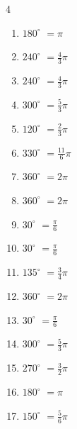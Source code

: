 \begin{multicols}{4}
\begin{enumerate}
  \item $\displaystyle 180^{\circ}$
        $\displaystyle =\pi$

  \item $\displaystyle 240^{\circ}$
        $\displaystyle =\frac{4}{3}\pi$

  \item $\displaystyle 240^{\circ}$
        $\displaystyle =\frac{4}{3}\pi$

  \item $\displaystyle 300^{\circ}$
        $\displaystyle =\frac{5}{3}\pi$

  \item $\displaystyle 120^{\circ}$
        $\displaystyle =\frac{2}{3}\pi$

  \item $\displaystyle 330^{\circ}$
        $\displaystyle =\frac{11}{6}\pi$

  \item $\displaystyle 360^{\circ}$
        $\displaystyle =2\pi$

  \item $\displaystyle 360^{\circ}$
        $\displaystyle =2\pi$

  \item $\displaystyle 30^{\circ}$
        $\displaystyle =\frac{\pi}{6}$

  \item $\displaystyle 30^{\circ}$
        $\displaystyle =\frac{\pi}{6}$

\columnbreak %

\resetques

  \item $\displaystyle 135^{\circ}$
        $\displaystyle =\frac{3}{4}\pi$

  \item $\displaystyle 360^{\circ}$
        $\displaystyle =2\pi$

  \item $\displaystyle 30^{\circ}$
        $\displaystyle =\frac{\pi}{6}$

  \item $\displaystyle 300^{\circ}$
        $\displaystyle =\frac{5}{3}\pi$

  \item $\displaystyle 270^{\circ}$
        $\displaystyle =\frac{3}{2}\pi$

  \item $\displaystyle 180^{\circ}$
        $\displaystyle =\pi$

  \item $\displaystyle 150^{\circ}$
        $\displaystyle =\frac{5}{6}\pi$


\end{enumerate}
\end{multicols}
